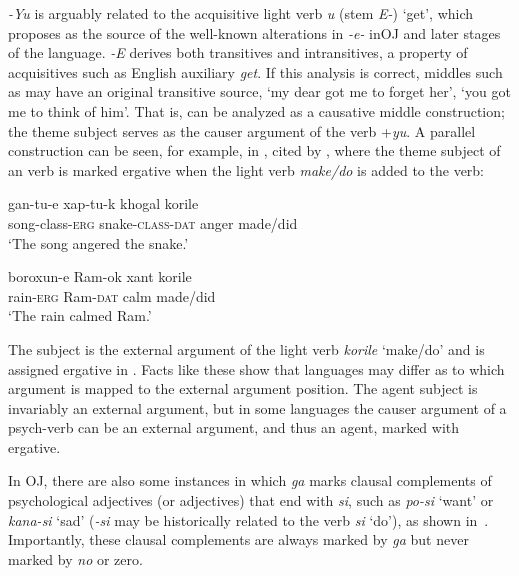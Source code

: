 \documentclass[output=paper]{LSP/langsci}
\begin{document}
\textit{-Yu} is arguably related to the acquisitive light verb \textit{u} (stem \textit{E-}) ‘get’, which \citet{Whitman2008Source} proposes as the source of the well-known  alterations in \textit{-e-} inOJ  and later stages of the language. \textit{-E} derives both transitives and intransitives, a property of acquisitives such as English auxiliary \textit{get}. If this analysis is correct,  middles such as  may have an original transitive source, \ie ‘my dear got me to forget her’, ‘you got me to think of him’. That is,  can be analyzed as a causative middle construction; the theme subject serves as the causer argument of the verb +\textit{yu}. A parallel construction can be seen, for example, in , cited by \citet{Woolford2008Differential}, where the theme subject of an  verb is marked ergative when the light verb \textit{make/do} is added to the verb: 


\begin{exe}
\ex%
\label{14-ya-ex:17}
\begin{xlist}
\ex
\label{14-ya-ex:17a}
\gll gan-tu-e xap-tu-k khogal korile\\
song-class-\textsc{erg} snake-\textsc{class}{}-\textsc{dat} anger made/did\\
\glt ‘The song angered the snake.’

\ex
\label{14-ya-ex:17b}
\gll boroxun-e Ram-ok xant korile\\
rain-\textsc{erg} Ram-\textsc{dat} calm made/did\\
\glt ‘The rain calmed Ram.’
\end{xlist}
\end{exe}


The subject is the external argument of the light verb \textit{korile} ‘make/do’ and is assigned ergative in . Facts like these show that languages may differ as to which argument is mapped to the external argument position. The agent subject is invariably an external argument, but in some languages the causer argument of a psych-verb can be an external argument, and thus an agent, marked with ergative. 

In OJ, there are also some instances in which \textit{ga} marks clausal complements of psychological adjectives (or  adjectives) that end with \textit{si}, such as \textit{po-si} ‘want’ or \textit{kana-si} ‘sad’ (\textit{-si} may be historically related to the verb \textit{si} ‘do’), as shown in~. Importantly, these clausal complements are always marked by \textit{ga} but never marked by \textit{no} or zero. 
\end{document}
